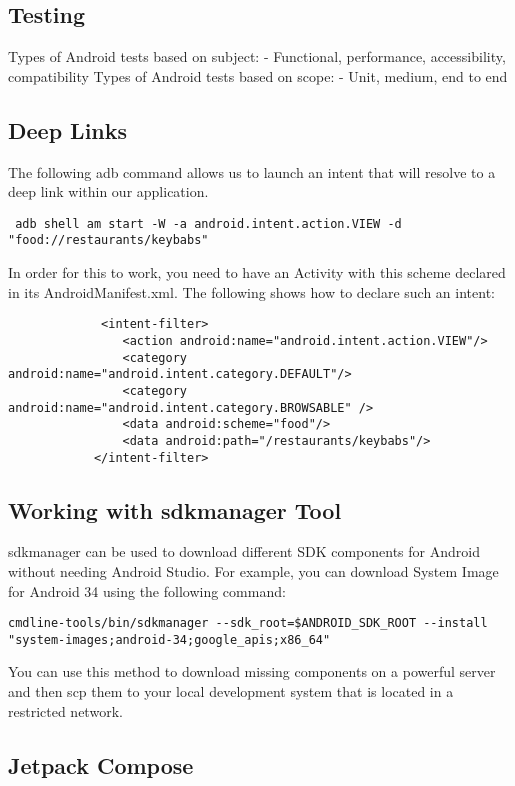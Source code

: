 \documentclass{article}
\begin{document}
\subsection{Testing}
Types of Android tests based on subject:
- Functional, performance, accessibility, compatibility
Types of Android tests based on scope:
- Unit, medium, end to end

\subsection{Deep Links}
The following adb command allows us to launch an intent that will resolve to a deep link within our application. 
 \begin{verbatim}
 adb shell am start -W -a android.intent.action.VIEW -d "food://restaurants/keybabs"
 \end{verbatim}
 
 In order for this to work, you need to have an Activity with this scheme declared in its AndroidManifest.xml. The following shows how to declare such an intent: 
 \begin{verbatim}
             <intent-filter>
                <action android:name="android.intent.action.VIEW"/>
                <category android:name="android.intent.category.DEFAULT"/>
                <category android:name="android.intent.category.BROWSABLE" />
                <data android:scheme="food"/>
                <data android:path="/restaurants/keybabs"/>
            </intent-filter>
 \end{verbatim}

\subsection{Working with sdkmanager Tool}
sdkmanager can be used to download different SDK components for Android without needing Android Studio. For example, you can download System Image for Android 34 using the following command:  
\begin{lstlisting}
cmdline-tools/bin/sdkmanager --sdk_root=$ANDROID_SDK_ROOT --install "system-images;android-34;google_apis;x86_64" 
\end{lstlisting}
You can use this method to download missing components on a powerful server and then scp them to your local development system that is located in a restricted network. 

\subsection{Jetpack Compose}
\end{document}
